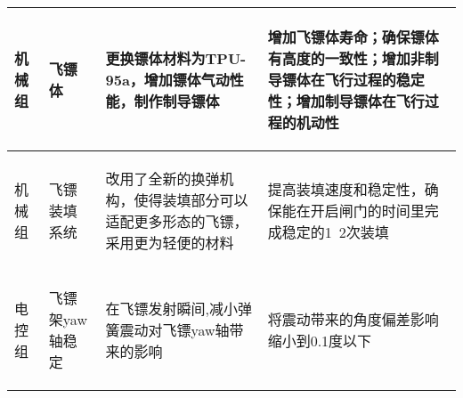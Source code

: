 \begin{longtable}{ p{1.5cm} | p{3cm} | p{6cm} | p{4.3cm} |}
    \hline

        \begin{center}
            机械组
        \end{center}&
        \begin{center}
            飞镖体
        \end{center}&
        \begin{center}
            更换镖体材料为TPU-95a，增加镖体气动性能，制作制导镖体
        \end{center}&
        \begin{center}
            增加飞镖体寿命；确保镖体有高度的一致性；增加非制导镖体在飞行过程的稳定性；增加制导镖体在飞行过程的机动性
        \end{center}\\
        
    \hline
    
        \begin{center}
            机械组
        \end{center} &
        \begin{center}
            飞镖装填系统
        \end{center} &
        \begin{center}
            改用了全新的换弹机构，使得装填部分可以适配更多形态的飞镖，采用更为轻便的材料
        \end{center} &
        \begin{center}
            提高装填速度和稳定性，确保能在开启闸门的时间里完成稳定的1~2次装填
        \end{center} \\

    \hline
    
        \begin{center}
            电控组
        \end{center} &
        \begin{center}
            飞镖架yaw轴稳定
        \end{center} &
        \begin{center}
            在飞镖发射瞬间,减小弹簧震动对飞镖yaw轴带来的影响
        \end{center} &
        \begin{center}
            将震动带来的角度偏差影响缩小到0.1度以下
        \end{center} \\


\end{longtable}
